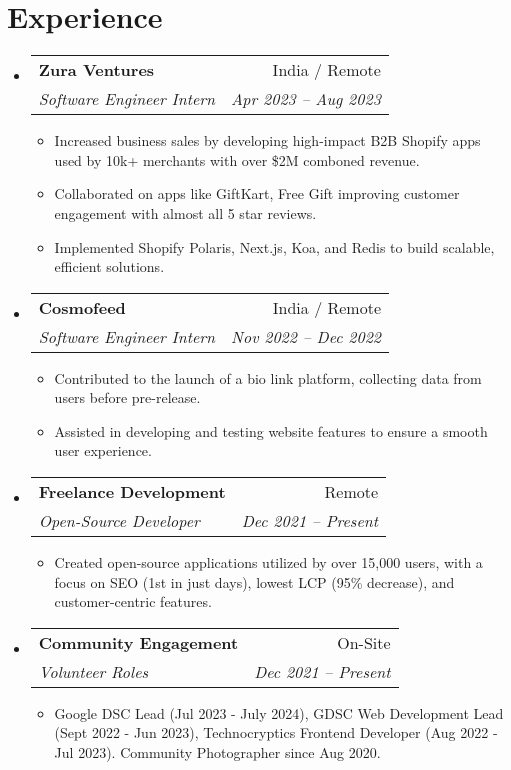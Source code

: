 \documentclass[letterpaper,11pt]{article}
\makeatletter
\newcommand{\resumeItem}[1]{
  \item\small{
    {#1 \vspace{-2pt}}
  }
}
\newcommand{\resumeSubheading}[4]{
  \vspace{-2pt}\item
    \begin{tabular*}{0.97\textwidth}[t]{l@{\extracolsep{\fill}}r}
      \textbf{#1} & #2 \\
      \textit{\small#3} & \textit{\small #4} \\
    \end{tabular*}\vspace{-7pt}
}
\newcommand{\resumeSubHeadingListStart}{\begin{itemize}[leftmargin=0.15in, label={}]}
\newcommand{\resumeSubHeadingListEnd}{\end{itemize}}
\newcommand{\resumeItemListStart}{\begin{itemize}}
\newcommand{\resumeItemListEnd}{\end{itemize}\vspace{-5pt}}
\makeatother
\begin{document}


\section{Experience}
    \resumeSubHeadingListStart
    
    \resumeSubheading{Zura Ventures}{India / Remote}
    {Software Engineer Intern}{Apr 2023 -- Aug 2023}
    \resumeItemListStart
    \resumeItem{Increased business sales by developing high-impact B2B Shopify apps used by 10k+ merchants with over \$2M comboned revenue.}
    \resumeItem{Collaborated on apps like GiftKart, Free Gift improving customer engagement with almost all 5 star reviews.}
    \resumeItem{Implemented Shopify Polaris, Next.js, Koa, and Redis to build scalable, efficient solutions.}
    \resumeItemListEnd
    
    \resumeSubheading{Cosmofeed}{India / Remote}
    {Software Engineer Intern}{Nov 2022 -- Dec 2022}
    \resumeItemListStart
    \resumeItem{Contributed to the launch of a bio link platform, collecting data from users before pre-release.}
    \resumeItem{Assisted in developing and testing website features to ensure a smooth user experience.}
    \resumeItemListEnd
    
    \resumeSubheading{Freelance Development}{Remote}{Open-Source Developer}{Dec 2021 -- Present}
    \resumeItemListStart
    \resumeItem{Created open-source applications utilized by over 15,000 users, with a focus on SEO (1st in just days), lowest LCP (95\% decrease), and customer-centric features.}
    \resumeItemListEnd

    \resumeSubheading{Community Engagement}{On-Site}{Volunteer Roles}{Dec 2021 -- Present}
    \resumeItemListStart
    \resumeItem{Google DSC Lead (Jul 2023 - July 2024), GDSC Web Development Lead (Sept 2022 - Jun 2023), Technocryptics Frontend Developer (Aug 2022 - Jul 2023). Community Photographer since Aug 2020.}
    \resumeItemListEnd

    \resumeSubHeadingListEnd

\end{document}
